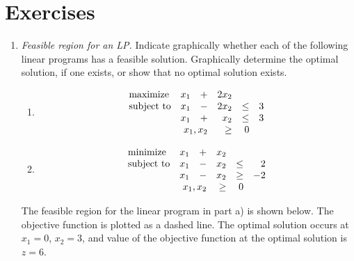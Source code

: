 \section{Exercises}
\begin{enumerate}

\item \emph{Feasible region for an LP.} Indicate graphically whether each of the following
  linear programs has a feasible solution. Graphically determine the
  optimal solution, if one exists, or show that no optimal solution
  exists.

\begin{enumerate}
\item
\[
  \begin{array}{lrrrrr}
    \textrm{maximize}   & x_1& +& 2x_2&  & \\
    \textrm{subject to} & x_1& -&2x_2& \leq & 3  \\
                        & x_1& +& x_2& \leq & 3 \\
    \multicolumn{3}{r}{x_1,x_2}&       \geq & 0 
  \end{array}
\]

\item
\[
  \begin{array}{lrrrrr}
    \textrm{minimize}   & x_1& +& x_2&  & \\
    \textrm{subject to} & x_1& -&x_2& \leq & 2  \\
                        & x_1& -& x_2& \geq & -2 \\
    \multicolumn{3}{r}{x_1,x_2}&       \geq & 0 
  \end{array}
\]

\end{enumerate}

\begin{solution}
\bs The feasible region for the linear program in part a) is shown
below. The objective function is plotted as a dashed line. The
optimal solution occurs at $x_1=0$, $x_2=3$, and value of the
objective function at the optimal solution is $z=6$.

\begin{center}
\end{center}
\end{solution}
\end{enumerate}
